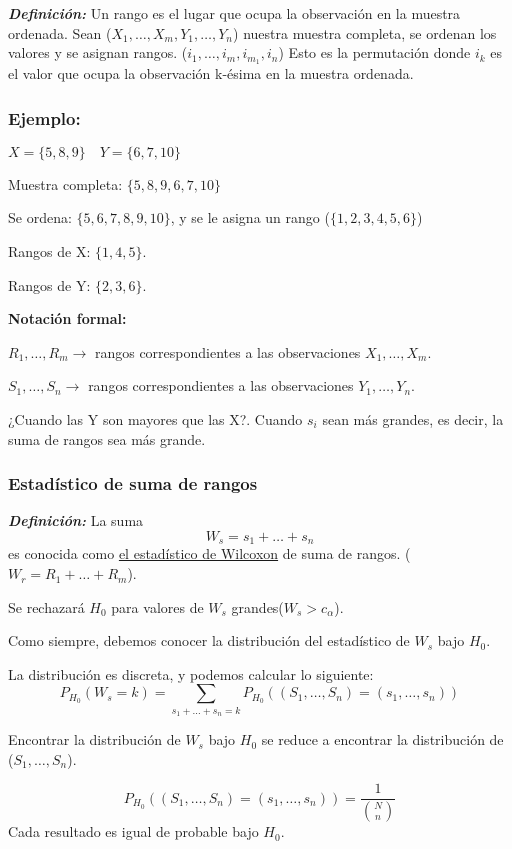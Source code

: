 \textbf{\textit{Definición:}} Un rango es el lugar que ocupa la observación en la muestra ordenada.
Sean ($X_1,\dots,X_m,Y_1,\dots,Y_n$) nuestra muestra completa, se ordenan los valores y se asignan rangos.
($i_1,\dots,i_m,i_{m_1},i_n$)
Esto es la permutación donde $i_k$ es el valor que ocupa la observación k-ésima en la muestra ordenada.
\newpage
\subsubsection*{Ejemplo:}
\(
X=\{5,8,9\} \quad Y=\{6,7,10\}
\)

Muestra completa: $\{5,8,9,6,7,10\}$

Se ordena: $\{5,6,7,8,9,10\}$, y se le asigna un rango ($\{1,2,3,4,5,6\}$)

Rangos de X: $\{1,4,5\}$.

Rangos de Y: $\{2,3,6\}$.

\textbf{Notación formal:}

$R_1,\dots,R_m \longrightarrow$ rangos correspondientes a las observaciones $X_1,\dots,X_m$.

$S_1,\dots,S_n \longrightarrow$ rangos correspondientes a las observaciones $Y_1,\dots,Y_n$.

¿Cuando las Y son mayores que las X?. Cuando $s_i$ sean más grandes, es decir, la suma de rangos sea más grande.

\subsubsection{Estadístico de suma de rangos}
\textit{\textbf{Definición: }} La suma
\[
W_s=s_1+\dots+s_n
\]
es conocida como
\href{https://es.wikipedia.org/wiki/Prueba_de_los_rangos_con_signo_de_Wilcoxon}{el estadístico de Wilcoxon}
de suma de rangos. ($W_r=R_1+\dots+R_m$).

Se rechazará $H_0$ para valores de $W_s$ grandes($W_s>c_\alpha$).

Como siempre, debemos conocer la distribución del estadístico de $W_s$ bajo $H_0$.

La distribución es discreta, y podemos calcular lo siguiente:
\[
P_{H_0}(W_s=k)=\sum_{s_1+\dots+s_n=k} P_{H_0} ((S_1,\dots,S_n)=(s_1,\dots,s_n))
\]

Encontrar la distribución de $W_s$ bajo $H_0$ se reduce a encontrar la distribución de ($S_1,\dots,S_n$).

\[
P_{H_0} ((S_1,\dots,S_n)=(s_1,\dots,s_n))=\frac{1}{\binom{N}{n}}
\]
Cada resultado es igual de probable bajo $H_0$.

